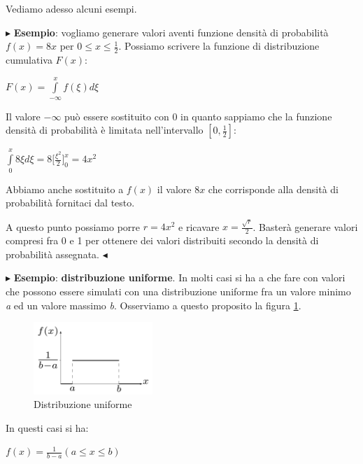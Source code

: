 \documentclass[11pt]{book}
\begin{document}
Vediamo adesso alcuni esempi.

\vspace{11pt} $\blacktriangleright$ {\bf Esempio}: vogliamo generare
valori aventi funzione densit\`a di probabilit\`a $f(x) = 8x$ per $0
\leq x \leq \frac{1}{2}$. Possiamo scrivere la funzione di
distribuzione cumulativa $F(x)$:

\begin{center}
$F(x) = \int\limits_{-\infty}^{x} f(\xi) d\xi$
\end{center}

Il valore $-\infty$ pu\`o essere sostituito con $0$ in quanto sappiamo
che la funzione densit\`a di probabilit\`a \`e limitata
nell'intervallo $[0,\frac{1}{2}]$:

\begin{center}
$\int\limits_{0}^x 8\xi d\xi = 8 \biggr[\frac{\xi^2}{2}\biggr]_0^x =
  4x^2$
\end{center}

Abbiamo anche sostituito a $f(x)$ il valore $8x$ che corrisponde alla
densit\`a di probabilit\`a fornitaci dal testo.

A questo punto possiamo porre $r = 4x^2$ e ricavare $x =
\frac{\sqrt{r}}{2}$. Baster\`a generare valori compresi fra 0 e 1 per
ottenere dei valori distribuiti secondo la densit\`a di probabilit\`a
assegnata. $\blacktriangleleft$
\vspace{11pt}

\vspace{11pt} $\blacktriangleright$ {\bf Esempio}: {\bf distribuzione
  uniforme}. In molti casi si ha a che fare con valori che possono
essere simulati con una distribuzione uniforme fra un valore minimo
{\em a} ed un valore massimo {\em b}. Osserviamo a questo proposito la
figura \ref{cap11fig2}.

\begin{figure}[H]
  \centering
  \includegraphics[width=0.4\textwidth]{images/cap11fig2.png}
  \caption{Distribuzione uniforme}
  \label{cap11fig2}
\end{figure}

In questi casi si ha:

\begin{center}
$f(x) = \frac{1}{b-a}(a \leq x \leq b)$  
\end{center}
\end{document}

